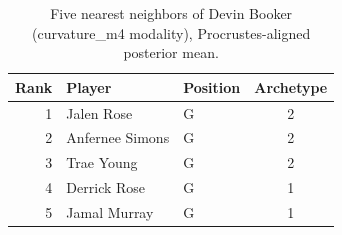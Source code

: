 \begin{table}[htbp]
  \centering\small
  \begin{tabular}{rllc}
    \toprule
    Rank & Player & Position & Archetype \\
    \midrule
    1 & Jalen Rose & G & 2 \\
    2 & Anfernee Simons & G & 2 \\
    3 & Trae Young & G & 2 \\
    4 & Derrick Rose & G & 1 \\
    5 & Jamal Murray & G & 1 \\
    \bottomrule
  \end{tabular}
  \caption{Five nearest neighbors of Devin Booker (curvature_m4 modality), Procrustes-aligned posterior mean.}
  \label{tab:Devin_Booker_neighbors_curvature_m4}
\end{table}

